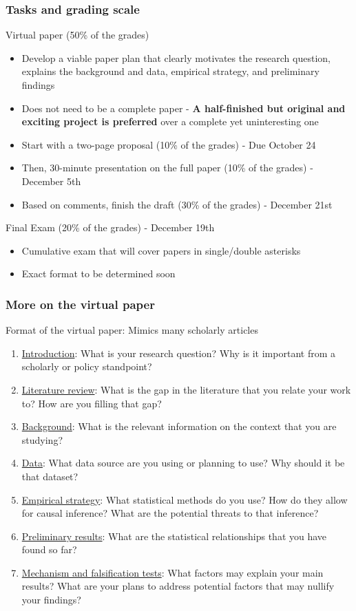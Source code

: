\documentclass[aspectratio=169]{beamer}
\newenvironment{wideitemize}{\itemize\addtolength{\itemsep}{10pt}}{\enditemize}
\begin{document}
\begin{frame}
\frametitle{Tasks and grading scale} 
\begin{wideitemize}
\item Virtual paper (50\% of the grades)
\begin{itemize}
\item Develop a viable paper plan that clearly motivates the research question, explains the background and data, empirical strategy, and preliminary findings
\item Does not need to be a complete paper - \textbf{A half-finished but original and exciting project is preferred} over a complete yet uninteresting one
\item Start with a two-page proposal (10\% of the grades) - Due October 24 
\item Then, 30-minute presentation on the full paper (10\% of the grades) - December 5th 
\item Based on comments, finish the draft (30\% of the grades) - December 21st
\end{itemize}
\item Final Exam (20\% of the grades) - December 19th 
\begin{itemize}
\item Cumulative exam that will cover papers in single/double asterisks
\item Exact format to be determined soon
\end{itemize}
\end{wideitemize}
\end{frame}

\begin{frame}
\frametitle{More on the virtual paper} 
\begin{wideitemize}
\item Format of the virtual paper: Mimics many scholarly articles
\begin{enumerate}
\item \underline{Introduction}: What is your research question? Why is it important from a scholarly or policy standpoint?
\item \underline{Literature review}: What is the gap in the literature that you relate your work to? How are you filling that gap?
\item \underline{Background}: What is the relevant information on the context that you are studying?
\item \underline{Data}: What data source are you using or planning to use? Why should it be that dataset? 
\item \underline{Empirical strategy}: What statistical methods do you use? How do they allow for causal inference? What are the potential threats to that inference?
\item \underline{Preliminary results}: What are the statistical relationships that you have found so far?
\item \underline{Mechanism and falsification tests}: What factors may explain your main results? What are your plans to address potential factors that may nullify your findings?
\end{enumerate}
\end{wideitemize}
\end{frame}
\end{document}
